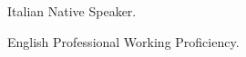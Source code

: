 \begin{cvskills}

  \cvskill
    {Italian}
    {Native Speaker.}

  \cvskill
    {English}
    {Professional Working Proficiency.}

\end{cvskills}
